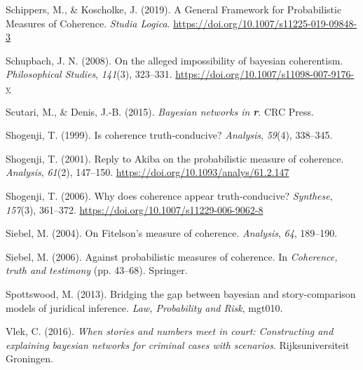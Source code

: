 \documentclass[
  10pt,
]{scrartcl}
\newlength{\cslhangindent}
\newlength{\cslentryspacingunit} %
\newenvironment{CSLReferences}[2] %
 {%
  \setlength{\parindent}{0pt}
  \ifodd #1
  \let\oldpar\par
  \def\par{\hangindent=\cslhangindent\oldpar}
  \fi
  \setlength{\parskip}{#2\cslentryspacingunit}
 }%
 {}
\begin{document}
\begin{CSLReferences}{1}{0}
\leavevmode{}%
Schippers, M., \& Koscholke, J. (2019). A {General Framework} for {Probabilistic Measures} of {Coherence}. \emph{Studia Logica}. \url{https://doi.org/10.1007/s11225-019-09848-3}

\leavevmode{}%
Schupbach, J. N. (2008). On the alleged impossibility of bayesian coherentism. \emph{Philosophical Studies}, \emph{141}(3), 323--331. \url{https://doi.org/10.1007/s11098-007-9176-y}

\leavevmode{}%
Scutari, M., \& Denis, J.-B. (2015). \emph{Bayesian networks in \textbf{{r}}}. CRC Press.

\leavevmode{}%
Shogenji, T. (1999). Is coherence truth-conducive? \emph{Analysis}, \emph{59}(4), 338--345.

\leavevmode{}%
Shogenji, T. (2001). Reply to {A}kiba on the probabilistic measure of coherence. \emph{Analysis}, \emph{61}(2), 147--150. \url{https://doi.org/10.1093/analys/61.2.147}

\leavevmode{}%
Shogenji, T. (2006). Why does coherence appear truth-conducive? \emph{Synthese}, \emph{157}(3), 361--372. \url{https://doi.org/10.1007/s11229-006-9062-8}

\leavevmode{}%
Siebel, M. (2004). On {F}itelson's measure of coherence. \emph{Analysis}, \emph{64}, 189--190.

\leavevmode{}%
Siebel, M. (2006). Against probabilistic measures of coherence. In \emph{Coherence, truth and testimony} (pp. 43--68). Springer.

\leavevmode{}%
Spottswood, M. (2013). Bridging the gap between bayesian and story-comparison models of juridical inference. \emph{Law, Probability and Risk}, mgt010.

\leavevmode{}%
Vlek, C. (2016). \emph{When stories and numbers meet in court: Constructing and explaining bayesian networks for criminal cases with scenarios}. Rijksuniversiteit Groningen.

\end{CSLReferences}
\end{document}
